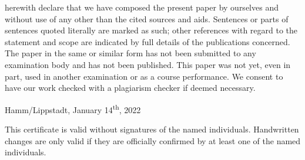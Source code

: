 \documentclass[english]{lni}
\begin{document}
herewith declare that we have composed the present paper by ourselves and without use of any other than the cited sources and aids. Sentences or parts of sentences quoted literally are marked as such; other references with regard to the statement and scope are indicated by full details of the publications concerned. The paper in the same or similar form has not been submitted to any examination body and has not been published. This paper was not yet, even in part, used in another examination or as a course performance. We consent to have our work checked with a plagiarism checker if deemed necessary.

Hamm/Lippstadt, January 14\textsuperscript{th}, 2022

This certificate is valid without signatures of the named individuals. Handwritten changes are only valid if they are officially confirmed by at least one of the named individuals.
\end{document}
